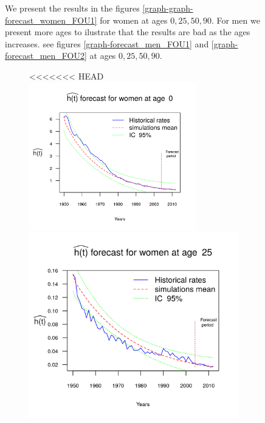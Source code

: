 \documentclass[smallextended]{svjour3}
\begin{document}
\begin{figure}[H]
We present the results in the figures \ref{graph-graph-forecast_women_FOU1} for
women at ages $0,25,50,90$. For men we present more ages to ilustrate that the
results are bad as the ages increases. see figures
\ref{graph-forecast_men_FOU1} and \ref{graph-forecast_men_FOU2} at ages
$0,25,50,90$.

\begin{figure}[H]
<<<<<<< HEAD
    \includegraphics[width = 2.85in]{PlotWomenForecast0.png}
    \includegraphics{PlotWomenForecast25.png}

\end{figure}
\end{figure}
\end{document}
